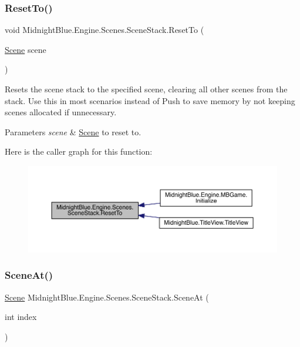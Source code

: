 \subsubsection{\texorpdfstring{Reset\+To()}{ResetTo()}}
{\footnotesize\ttfamily void Midnight\+Blue.\+Engine.\+Scenes.\+Scene\+Stack.\+Reset\+To (\begin{DoxyParamCaption}\item[{\hyperlink{class_midnight_blue_1_1_engine_1_1_scenes_1_1_scene}{Scene}}]{scene }\end{DoxyParamCaption})\hspace{0.3cm}{\ttfamily [inline]}}



Resets the scene stack to the specified scene, clearing all other scenes from the stack. Use this in most scenarios instead of Push to save memory by not keeping scenes allocated if unnecessary. 


\begin{DoxyParams}{Parameters}
{\em scene} & \hyperlink{class_midnight_blue_1_1_engine_1_1_scenes_1_1_scene}{Scene} to reset to.\\
\hline
\end{DoxyParams}
Here is the caller graph for this function\+:
\nopagebreak
\begin{figure}[H]
\begin{center}
\leavevmode
\includegraphics[width=350pt]{class_midnight_blue_1_1_engine_1_1_scenes_1_1_scene_stack_a8bddd32efa3f6133aa3899a164160431_icgraph}
\end{center}
\end{figure}
\hypertarget{class_midnight_blue_1_1_engine_1_1_scenes_1_1_scene_stack_a7c391b4275e6e8c72478c3e73560f4df}{}\label{class_midnight_blue_1_1_engine_1_1_scenes_1_1_scene_stack_a7c391b4275e6e8c72478c3e73560f4df} 
\subsubsection{\texorpdfstring{Scene\+At()}{SceneAt()}}
{\footnotesize\ttfamily \hyperlink{class_midnight_blue_1_1_engine_1_1_scenes_1_1_scene}{Scene} Midnight\+Blue.\+Engine.\+Scenes.\+Scene\+Stack.\+Scene\+At (\begin{DoxyParamCaption}\item[{int}]{index }\end{DoxyParamCaption})\hspace{0.3cm}{\ttfamily [inline]}}



